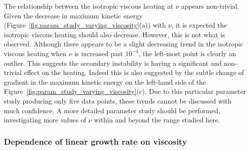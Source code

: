 The relationship between the isotropic viscous heating at $\nu$ appears non-trivial. Given the decrease in maximum kinetic energy (Figure~\ref{fig:param_study_varying_viscosity}(a)) with $\nu$, it is expected the isotropic viscous heating should also decrease. However, this is not what is observed. Although there appears to be a slight decreasing trend in the isotropic viscous heating when $\nu$ is increased past $10^{-4}$, the left-most point is clearly an outlier. This suggests the secondary instability is having a significant and non-trivial effect on the heating. Indeed this is also suggested by the subtle change of gradient in the maximum kinetic energy on the left-hand side of the Figure~\ref{fig:param_study_varying_viscosity}(c). Due to this particular parameter study producing only five data points, these trends cannot be discussed with much confidence. A more detailed parameter study should be performed, investigating more values of $\nu$ within and beyond the range studied here.

\subsubsection{Dependence of linear growth rate on viscosity}
\label{sec:linear_growth_rate_varying_visc}

